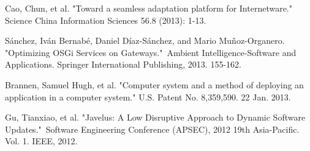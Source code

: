 \documentclass[conference]{IEEEtran}
\begin{document}
\begin{thebibliography}{9}
Cao, Chun, et al. "Toward a seamless adaptation platform for Internetware." Science China Information Sciences 56.8 (2013): 1-13.

Sánchez, Iván Bernabé, Daniel Díaz-Sánchez, and Mario Muñoz-Organero. "Optimizing OSGi Services on Gateways." Ambient Intelligence-Software and Applications. Springer International Publishing, 2013. 155-162.

Brannen, Samuel Hugh, et al. "Computer system and a method of deploying an application in a computer system." U.S. Patent No. 8,359,590. 22 Jan. 2013.

Gu, Tianxiao, et al. "Javelus: A Low Disruptive Approach to Dynamic Software Updates." Software Engineering Conference (APSEC), 2012 19th Asia-Pacific. Vol. 1. IEEE, 2012.

\end{thebibliography}


\end{document}
